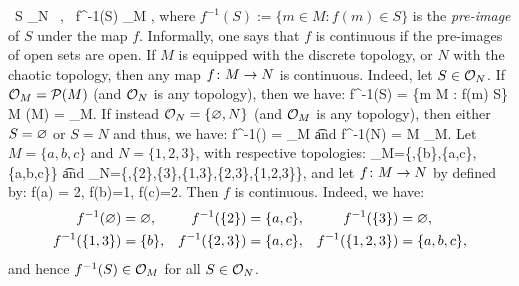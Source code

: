 \bse
\forall \, S \in \cO_N \, , \ f^{-1}(S) \in \cO_M ,
\ese
where $f^{-1}(S) := \{m \in M : f(m) \in S\}$ is the \emph{pre-image} of $S$ under the map $f$.
\ed
Informally, one says that $f$ is continuous if the pre-images of open sets are open. 
\be
If $M$ is equipped with the discrete topology, or $N$ with the chaotic topology, then any map $f\colon M \to N$ is continuous. Indeed, let $S \in \mathcal{O}_N$. If $\mathcal{O}_M=\mathcal{P}(M)$ (and $\mathcal{O}_N$ is any topology), then we have:
\bse
f^{-1}(S) = \{m \in M : f(m) \in S\} \se M \in \cP(M) = \cO_M.
\ese
If instead $\mathcal{O}_N=\{\varnothing,N\}$ (and $\mathcal{O}_M$ is any topology), then either $S=\varnothing$ or $S=N$ and thus, we have:
\bse
f^{-1}(\vn) = \vn \in \cO_M \quad \t{and} \quad f^{-1}(N) = M \in \cO_M.
\ese
\ee
\be
Let $M = \{a,b,c\}$ and $N=\{1,2,3\}$, with respective topologies:
\bse
\cO_M=\{\vn,\{b\},\{a,c\},\{a,b,c\}\} \quad \t{and} \quad \cO_N=\{\vn,\{2\},\{3\},\{1,3\},\{2,3\},\{1,2,3\}\},
\ese
and let $f\colon M \to N$ by defined by:
\bse
f(a) = 2, \quad f(b)=1, \quad f(c)=2.
\ese
Then $f$ is continuous. Indeed, we have:
\begin{align*}
f^{-1}(\varnothing) &= \varnothing, & f^{-1}(\{2\}) &= \{a,c\}, & f^{-1}(\{3\}) &= \varnothing,\\ 
f^{-1}(\{1,3\}) &= \{b\}, & f^{-1}(\{2,3\}) &= \{a,c\}, & f^{-1}(\{1,2,3\}) &= \{a,b,c\},
\end{align*}
and hence $f^{-1}(S) \in \mathcal{O}_M$ for all $S \in \mathcal{O}_N$.
\ee






















